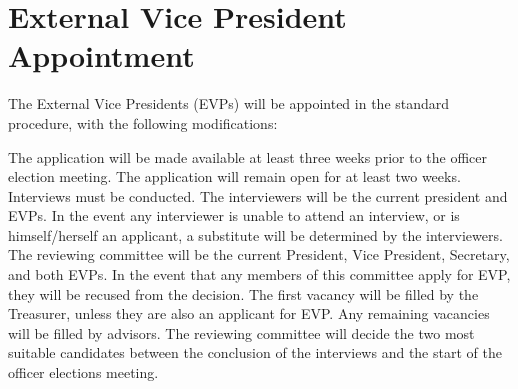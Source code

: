 \section{External Vice President Appointment}
The External Vice Presidents (EVPs) will be appointed in the standard procedure, with the following modifications:
\begin{enumsubsection}
\itemnotoc The application will be made available at least three weeks prior to the officer election meeting.
\itemnotoc The application will remain open for at least two weeks.
\itemnotoc Interviews must be conducted.
The interviewers will be the current president and EVPs.
In the event any interviewer is unable to attend an interview, or is himself/herself an applicant, a substitute will be determined by the interviewers.
\itemnotoc The reviewing committee will be the current President, Vice President, Secretary, and both EVPs.
In the event that any members of this committee apply for EVP, they will be recused from the decision.
The first vacancy will be filled by the Treasurer, unless they are also an applicant for EVP.
Any remaining vacancies will be filled by advisors.
\itemnotoc The reviewing committee will decide the two most suitable candidates between the conclusion of the interviews and the start of the officer elections meeting.
\end{enumsubsection}

